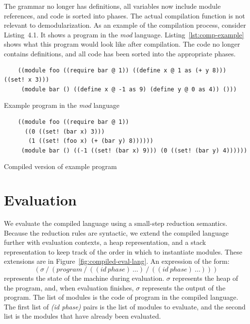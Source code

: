 The grammar no longer has definitions, all variables now include module references, and code is sorted into phases.
The actual compilation function is not relevant to demodularization.
As an example of the compilation process, consider Listing~4.1.
It shows a program in the \emph{mod} language.
Listing~\ref{lst:comp-example} shows what this program would look like after compilation.
The code no longer contains definitions, and all code has been sorted into the appropriate phases.
\begin{listing}
  \begin{verbatim}
    ((module foo ((require bar @ 1)) ((define x @ 1 as (+ y 8))) ((set! x 3)))
     (module bar () ((define x @ -1 as 9) (define y @ 0 as 4)) ()))
  \end{verbatim}
  \label{lst:exp-example}
  \caption{Example program in the \emph{mod} language}
\end{listing}

\begin{listing}
  \begin{verbatim}
    ((module foo ((require bar @ 1)) 
      ((0 ((set! (bar x) 3))) 
       (1 ((set! (foo x) (+ (bar y) 8))))))
     (module bar () ((-1 ((set! (bar x) 9))) (0 ((set! (bar y) 4))))))
  \end{verbatim}
  \label{lst:comp-example}
  \caption{Compiled version of example program}
\end{listing}

\section{Evaluation}

We evaluate the compiled language using a small-step reduction semantics. 
Because the reduction rules are syntactic, we extend the compiled language further with evaluation contexts, a heap representation, and a stack representation to keep track of the order in which to instantiate modules.
These extensions are in Figure~\ref{fig:compiled-eval-lang}.
An expression of the form:
\[
  (\sigma\ /\ (program\ /\ ((id\ phase)\ \ldots)\ /\ ((id\ phase)\ \ldots)))
\]
represents the state of the machine during evaluation.
$\sigma$ represents the heap of the program, and, when evaluation finishes, $\sigma$ represents the output of the program.
The list of modules is the code of program in the compiled language.
The first list of \emph{(id phase)} pairs is the list of modules to evaluate, and the second list is the modules that have already been evaluated.

